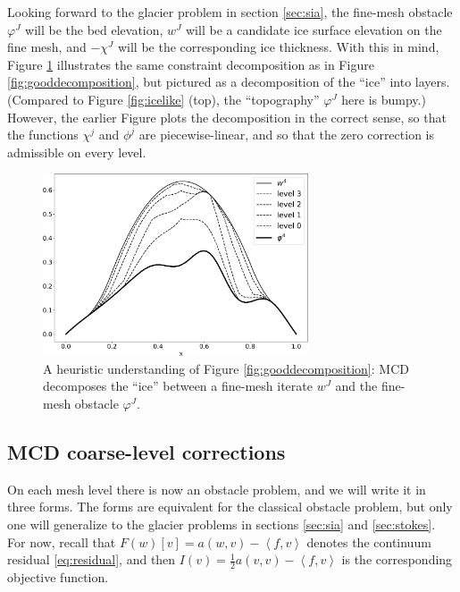 \documentclass[letterpaper,final,12pt,reqno]{amsart}
\theoremstyle{claim}
\newcommand{\ip}[2]{\left<#1,#2\right>}
\numberwithin{equation}{section}
\numberwithin{figure}{section}
\numberwithin{table}{section}
\numberwithin{theorem}{section}
\begin{document}
Looking forward to the glacier problem in section \ref{sec:sia}, the fine-mesh obstacle $\varphi^J$ will be the bed elevation, $w^J$ will be a candidate ice surface elevation on the fine mesh, and $-\chi^J$ will be the corresponding ice thickness.  With this in mind, Figure \ref{fig:icelikedecomposition} illustrates the same constraint decomposition as in Figure \ref{fig:gooddecomposition}, but pictured as a decomposition of the ``ice'' into layers.  (Compared to Figure \ref{fig:icelike} (top), the ``topography'' $\varphi^J$ here is bumpy.)  However, the earlier Figure plots the decomposition in the correct sense, so that the functions $\chi^j$ and $\phi^j$ are piecewise-linear, and so that the zero correction is admissible on every level.

\begin{figure}
\includegraphics[width=0.7\textwidth]{fixfigs/icedec_defect.pdf}
\caption{A heuristic understanding of Figure \ref{fig:gooddecomposition}: MCD decomposes the ``ice'' between a fine-mesh iterate $w^J$ and the fine-mesh obstacle $\varphi^J$.}
\label{fig:icelikedecomposition}
\end{figure}

\subsection{MCD coarse-level corrections} \label{subsec:mcdcorrections}  On each mesh level there is now an obstacle problem, and we will write it in three forms.  The forms are equivalent for the classical obstacle problem, but only one will generalize to the glacier problems in sections \ref{sec:sia} and \ref{sec:stokes}.  For now, recall that $F(w)[v] = a(w,v) - \ip{f}{v}$ denotes the continuum residual \eqref{eq:residual}, and then $I(v) = \frac{1}{2} a(v,v) - \ip{f}{v}$ is the corresponding objective function.
\end{document}
